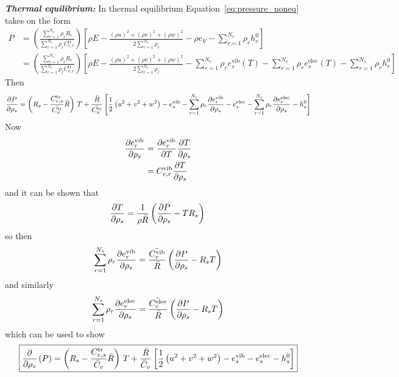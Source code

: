 \textbf{\emph{Thermal equilibrium:}}
In thermal equilibrium Equation~\eqref{eq:pressure_noneq} takes on the form
\begin{align*}
  P &=\left(\frac{\sum_{r=1}^{N_s} \rho_r R_r}{\sum_{r=1}^{N_s} \rho_r C^{\text{tr}}_{v,r}}\right)\left[\rho E - \frac{\left(\rho u\right)^2+\left(\rho v\right)^2+\left(\rho w\right)^2}{2 \sum_{r=1}^{N_s}\rho_r} - \rho e_V  - \sum_{r=1}^{N_s} \rho_r h^0_r\right] \\
  &=\left(\frac{\sum_{r=1}^{N_s} \rho_r R_r}{\sum_{r=1}^{N_s} \rho_r C^{\text{tr}}_{v,r}}\right)\left[\rho E - \frac{\left(\rho u\right)^2+\left(\rho v\right)^2+\left(\rho w\right)^2}{2 \sum_{r=1}^{N_s}\rho_r} - \sum_{r=1}^{N_s}\rho_r e^{\text{vib}}_s\left(T\right) - \sum_{r=1}^{N_s}\rho_r e^{\text{elec}}_s\left(T\right) - \sum_{r=1}^{N_s} \rho_r h^0_r\right]
\end{align*}
Then
\begin{equation*}
  {\frac{\partial{P}}{\partial{\rho_s}}} =\left(R_s - \frac{C^{\text{tr}}_{v,s}}{\bar{C^{\text{tr}}_v}}\bar{R}\right)\,T + \frac{\bar{R}}{\bar{C^{\text{tr}}_v}}\left[\frac{1}{2}\left(u^2 + v^2 +w^2\right) - e^{\text{vib}}_s - \sum_{r=1}^{N_s} \rho_r {\frac{\partial{e^{\text{vib}}_r}}{\partial{\rho_s}}}- e^{\text{elec}}_s - \sum_{r=1}^{N_s} \rho_r {\frac{\partial{e^{\text{elec}}_r}}{\partial{\rho_s}}}- h^0_s\right]
\end{equation*}
Now
\begin{align*}
  {\frac{\partial{e^{\text{vib}}_r}}{\partial{\rho_s}}} &= {\frac{\partial{e^{\text{vib}}_r}}{\partial{T}}}{\frac{\partial{T}}{\partial{\rho_s}}} \\
                                 &=      C^{\text{vib}}_{v,r}{\frac{\partial{T}}{\partial{\rho_s}}}
\end{align*}
and it can be shown that
\begin{equation*}
  {\frac{\partial{T}}{\partial{\rho_s}}} = \frac{1}{\rho \bar{R}}\left({\frac{\partial{P}}{\partial{\rho_s}}} - T R_s\right) \\
\end{equation*}
so then
\begin{equation*}
  \sum_{r=1}^{N_s}\rho_r {\frac{\partial{e^{\text{vib}}_r}}{\partial{\rho_s}}} = \frac{\bar{C^{\text{vib}}_v}}{\bar{R}}\left({\frac{\partial{P}}{\partial{\rho_s}}} - R_s T\right)
\end{equation*}
and similarly
\begin{equation*}
  \sum_{r=1}^{N_s}\rho_r {\frac{\partial{e^{\text{elec}}_r}}{\partial{\rho_s}}} = \frac{\bar{C^{\text{elec}}_v}}{\bar{R}}\left({\frac{\partial{P}}{\partial{\rho_s}}} - R_s T\right)
\end{equation*}
which can be used to show
\begin{equation}
  \boxed{{\frac{\partial{}}{\partial{\rho_s}}}\left(P\right) =\left(R_s - \frac{C^{\text{tr}}_{v,s}}{\bar{C}_v}\bar{R}\right)\,T + \frac{\bar{R}}{\bar{C}_v}\left[\frac{1}{2}\left(u^2 + v^2 +w^2\right) - e^{\text{vib}}_s - e^{\text{elec}}_s - h^0_s\right]}
  \label{eq:dPdrhos_teq}
\end{equation}
